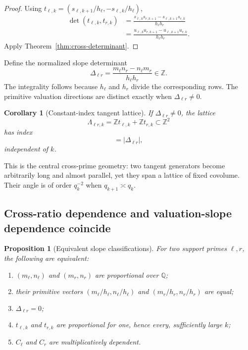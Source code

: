 \documentclass[11pt,oneside]{article}
\newtheorem{proposition}[theorem]{Proposition}
\newtheorem{corollary}[theorem]{Corollary}
\theoremstyle{definition}
\theoremstyle{remark}
\newcommand{\Z}{\mathbb Z}
\newcommand{\Q}{\mathbb Q}
\begin{document}
\begin{proof}
Using $t_{\ell,k}=(s_{\ell,k+1}/h_\ell,-s_{\ell,k}/h_\ell)$,
\begin{align*}
 \det(t_{\ell,k},t_{r,k})
 &=\frac{s_{\ell,k}s_{r,k+1}-s_{\ell,k+1}s_{r,k}}
        {h_\ell h_r}\\
 &=\frac{u_{\ell,k}u_{r,k+1}-u_{\ell,k+1}u_{r,k}}
        {h_\ell h_r}.
\end{align*}
Apply Theorem~\ref{thm:cross-determinant}.
\end{proof}

Define the normalized slope determinant
\begin{equation}
 \Delta_{\ell r}
 =\frac{m_\ell n_r-n_\ell m_r}{h_\ell h_r}\in\Z.
 \label{eq:Delta-lr}
\end{equation}
The integrality follows because $h_\ell$ and $h_r$ divide the corresponding rows.  The
primitive valuation directions are distinct exactly when $\Delta_{\ell r}\ne0$.

\begin{corollary}[Constant-index tangent lattice]
\label{cor:constant-index}
If $\Delta_{\ell r}\ne0$, the lattice
\begin{equation}
 \Lambda_{\ell r,k}
 =\Z t_{\ell,k}+\Z t_{r,k}\subset\Z^2
 \label{eq:tangent-lattice}
\end{equation}
has index
\begin{equation}
 [\Z^2:\Lambda_{\ell r,k}]=|\Delta_{\ell r}|,
 \label{eq:lattice-index}
\end{equation}
independent of $k$.
\end{corollary}

This is the central cross-prime geometry: two tangent generators become arbitrarily long and
almost parallel, yet they span a lattice of fixed covolume.  Their angle is of order
$q_k^{-2}$ when $q_{k+1}\asymp q_k$.

\subsection{Cross-ratio dependence and valuation-slope dependence coincide}

\begin{proposition}[Equivalent slope classifications]
\label{prop:slope-classification}
For two support primes $\ell,r$, the following are equivalent:
\begin{enumerate}
\item $(m_\ell,n_\ell)$ and $(m_r,n_r)$ are proportional over $\Q$;
\item their primitive vectors
$(m_\ell/h_\ell,n_\ell/h_\ell)$ and
$(m_r/h_r,n_r/h_r)$ are equal;
\item $\Delta_{\ell r}=0$;
\item $t_{\ell,k}$ and $t_{r,k}$ are proportional for one, hence every, sufficiently large
$k$;
\item $C_\ell$ and $C_r$ are multiplicatively dependent.
\end{enumerate}
\end{proposition}
\end{document}
